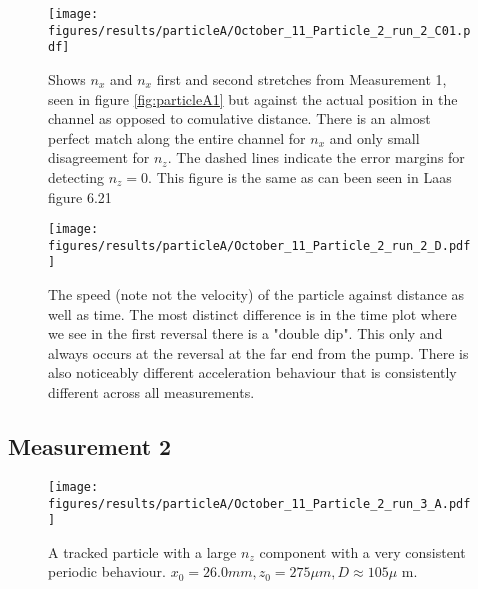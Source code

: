 \begin{figure}[H]
\begin{center}
\texttt{[image: figures/results/particleA/October\_11\_Particle\_2\_run\_2\_C01.pdf]}
\end{center}
\caption{Shows $n_x$ and $n_x$ first and second stretches from Measurement 1, seen in figure \ref{fig:particleA1} but against the actual position in the channel as opposed to comulative distance. There is an almost perfect match along the entire channel for $n_x$ and only small disagreement for $n_z$. The dashed lines indicate the error margins for detecting $n_z=0$. This figure is the same as can been seen in Laas\cite{alexanderThesis} figure 6.21}
\label{fig:particleAreversegood}
\end{figure}

\begin{figure}[H]
\begin{center}
\texttt{[image: figures/results/particleA/October\_11\_Particle\_2\_run\_2\_D.pdf]}
\end{center}
\caption{The speed (note not the velocity) of the particle against distance as well as time. The most distinct difference is in the time plot where we see in the first reversal there is a "double dip". This only and always occurs at the reversal at the far end from the pump. There is also noticeably different acceleration behaviour that is consistently different across all measurements.}
\label{fig:particleAspeed}
\end{figure}

\subsection{Measurement 2}

\begin{figure}[H]
\begin{center}
\texttt{[image: figures/results/particleA/October\_11\_Particle\_2\_run\_3\_A.pdf]}
\end{center}
\caption{A tracked particle with a large $n_z$ component with a very consistent periodic behaviour. 
$ x_0 = 26.0 mm, z_0 = 275\mu m, D\approx 105\mu$ m.}
\label{fig:particleA2}
\end{figure}


